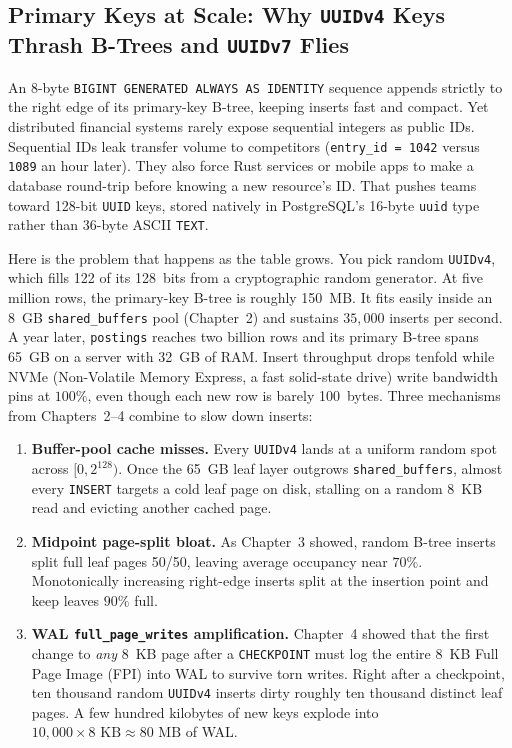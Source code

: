 \subsection{Primary Keys at Scale: Why \texttt{UUIDv4} Keys Thrash B-Trees and \texttt{UUIDv7} Flies}
\label{ch08:uuid-types}

An 8-byte \texttt{BIGINT GENERATED ALWAYS AS IDENTITY} sequence appends strictly
to the right edge of its primary-key B-tree, keeping inserts fast and compact. Yet
distributed financial systems rarely expose sequential integers as public IDs.
Sequential IDs leak transfer volume to competitors (\texttt{entry\_id = 1042}
versus \texttt{1089} an hour later). They also force Rust services or mobile apps
to make a database round-trip before knowing a new resource's ID. That pushes teams
toward 128-bit \texttt{UUID} keys, stored natively in PostgreSQL's 16-byte
\texttt{uuid} type rather than 36-byte ASCII \texttt{TEXT}.

Here is the problem that happens as the table grows. You pick
random \texttt{UUIDv4}, which fills 122 of its 128~bits from a cryptographic random
generator. At five million rows, the primary-key B-tree is roughly 150~MB. It fits
easily inside an 8~GB \texttt{shared\_buffers} pool (Chapter~2) and sustains
$35{,}000$ inserts per second. A year later, \texttt{postings} reaches two billion
rows and its primary B-tree spans 65~GB on a server with 32~GB of RAM. Insert
throughput drops tenfold while NVMe (Non-Volatile Memory Express, a fast solid-state drive) write bandwidth pins at $100\%$, even though
each new row is barely 100~bytes. Three mechanisms from Chapters~2--4 combine to
slow down inserts:

\begin{enumerate}
  \item \textbf{Buffer-pool cache misses.} Every \texttt{UUIDv4} lands at a uniform
    random spot across $[0, 2^{128})$. Once the 65~GB leaf layer outgrows
    \texttt{shared\_buffers}, almost every \texttt{INSERT} targets a cold leaf page
    on disk, stalling on a random 8~KB read and evicting another cached page.
  \item \textbf{Midpoint page-split bloat.} As Chapter~3 showed, random B-tree
    inserts split full leaf pages 50/50, leaving average occupancy near $70\%$.
    Monotonically increasing right-edge inserts split at the insertion point and
    keep leaves $90\%$ full.
  \item \textbf{WAL \texttt{full\_page\_writes} amplification.} Chapter~4 showed
    that the first change to \emph{any} 8~KB page after a \texttt{CHECKPOINT} must
    log the entire 8~KB Full Page Image (FPI) into WAL to survive torn writes. Right
    after a checkpoint, ten thousand random \texttt{UUIDv4} inserts dirty roughly
    ten thousand distinct leaf pages. A few hundred kilobytes of new keys explode
    into $10{,}000 \times 8\text{ KB} \approx 80\text{ MB}$ of WAL.
\end{enumerate}

